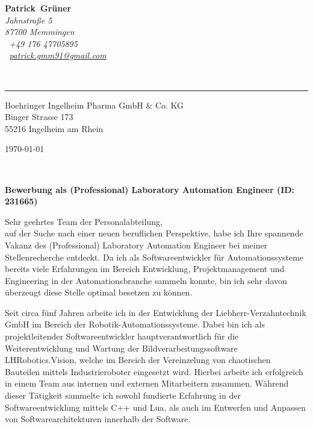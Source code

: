 \documentclass[10pt,a4paper]{article}
\def\firstname{Patrick}
\def\familyname{Grüner}
\begin{document}
\sffamily   %
\hfill%
\begin{minipage}[t]{.6\textwidth}
	\raggedleft%
	{\bfseries {\color{firstnamecolor}\firstname}~{\color{familynamecolor}\familyname}}\\[.35ex]
	\small\itshape%
	Jahnstraße 5\\
	87700 Memmingen\\[.35ex]
	\Mobilefone~+49 176 47705895\\
	\Letter~\href{mailto:patrick.gmm91@gmail.com}{patrick.gmm91@gmail.com}
\end{minipage}\\[0.5em]
%
{\color{firstnamecolor}\rule{\textwidth}{.25ex}}
%
\begin{minipage}[t]{.5\textwidth}
	\raggedright%
	\vspace*{1em}
	Boehringer Ingelheim Pharma GmbH \& Co. KG\\[.35ex]
	\small%
	Binger Strasse 173  \\
	55216 Ingelheim am Rhein 
\end{minipage}
%
\hfill
%
\begin{minipage}[t]{.4\textwidth}
	\raggedleft %
	\today
\end{minipage}\\[1em]
\raggedright

{\bfseries \color{familynamecolor}Bewerbung als (Professional) Laboratory Automation Engineer (ID: 231665)\\[1.5em]}

Sehr geehrtes Team der Personalabteilung,\\[1em]
%
auf der Suche nach einer neuen beruflichen Perspektive, habe ich Ihre spannende Vakanz des (Professional) Laboratory Automation Engineer bei meiner Stellenrecherche entdeckt. Da ich als Softwareentwickler für Automationssysteme bereits viele Erfahrungen im Bereich Entwicklung, Projektmanagement und Engineering in der Automationsbranche sammeln konnte, bin ich sehr davon überzeugt diese Stelle optimal besetzen zu können.

Seit circa fünf Jahren arbeite ich in der Entwicklung der Liebherr-Verzahntechnik GmbH im Bereich der Robotik-Automationssysteme. Dabei bin ich als projektleitender Softwareentwickler hauptverantwortlich für die Weiterentwicklung und Wartung der Bildverarbeitungssoftware LHRobotics.Vision, welche im Bereich der Vereinzelung von chaotischen Bauteilen mittels Industrieroboter eingesetzt wird. Hierbei arbeite ich erfolgreich in einem Team aus internen und externen Mitarbeitern zusammen. Während dieser Tätigkeit sammelte ich sowohl fundierte Erfahrung in der Softwareentwicklung mittels C++ und Lua, als auch im Entwerfen und Anpassen von Softwarearchitekturen innerhalb der Software. 
\end{document}
